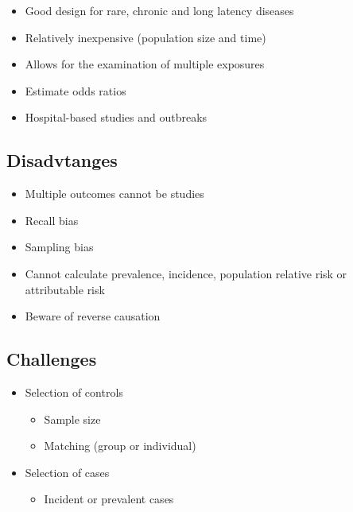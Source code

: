 \documentclass[
]{book}
\providecommand{\tightlist}{%
  \setlength{\itemsep}{0pt}\setlength{\parskip}{0pt}}
\begin{document}
\begin{itemize}
\tightlist
\item
  Good design for rare, chronic and long latency diseases
\item
  Relatively inexpensive (population size and time)
\item
  Allows for the examination of multiple exposures
\item
  Estimate odds ratios
\item
  Hospital-based studies and outbreaks
\end{itemize}

\hypertarget{disadvtanges}{%
\subsection{Disadvtanges}\label{disadvtanges}}

\begin{itemize}
\tightlist
\item
  Multiple outcomes cannot be studies
\item
  Recall bias
\item
  Sampling bias
\item
  Cannot calculate prevalence, incidence, population relative risk or attributable risk
\item
  Beware of reverse causation
\end{itemize}

\hypertarget{challenges}{%
\subsection{Challenges}\label{challenges}}

\begin{itemize}
\tightlist
\item
  Selection of controls

  \begin{itemize}
  \tightlist
  \item
    Sample size
  \item
    Matching (group or individual)
  \end{itemize}
\item
  Selection of cases

  \begin{itemize}
  \tightlist
  \item
    Incident or prevalent cases
  \end{itemize}
\end{itemize}
\end{document}
